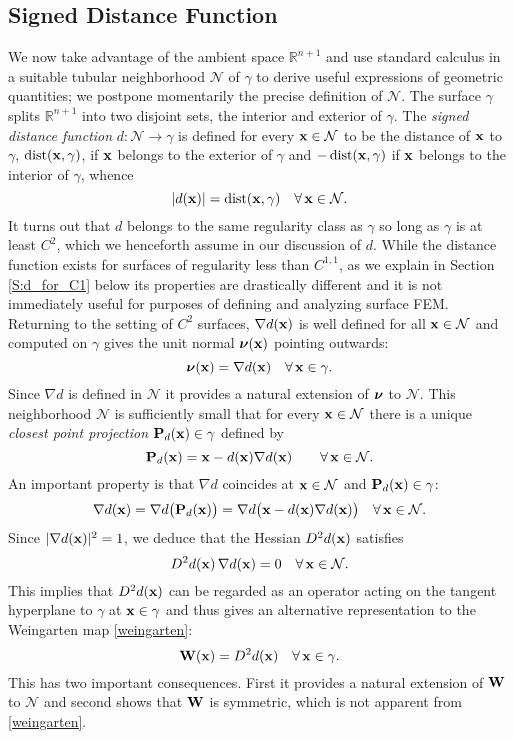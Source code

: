 \subsection{Signed Distance Function}\label{S:distance-function}
%
We now take advantage of the ambient space $\mathbb R^{n+1}$ and use
standard calculus in a suitable tubular neighborhood $\mathcal N$ of $\gamma$
to derive useful expressions of geometric quantities; we postpone
momentarily the precise definition of $\mathcal N$.  The surface $\gamma$ splits
$\mathbb{R}^{n+1}$ into two disjoint sets, the interior and exterior of $\gamma$.
The \emph{signed distance function} $d:\mathcal N \rightarrow \gamma$ is
defined for every ${\bf x}\in\mathcal N$ to be the distance of ${\bf x}$ to $\gamma$,
$\operatorname{dist}({\bf x},\gamma)$, if
${\bf x}$ belongs to the exterior of $\gamma$ and $-\operatorname{dist}({\bf x},\gamma)$ if ${\bf x}$ belongs
to the interior of $\gamma$, whence
%
\[
|d({\bf x})| = \operatorname{dist}({\bf x},\gamma)
\quad\forall \, {\bf x}\in\mathcal N.
\]
%
It turns out that $d$ belongs to the same regularity class as $\gamma$ so long as $\gamma$ is at least $C^2$, which we henceforth assume in our discussion of $d$.  While the distance function exists for surfaces of regularity less than $C^{1,1}$, as we explain in Section \ref{S:d_for_C1} below its properties are drastically different and it is not immediately useful for purposes of defining and analyzing surface FEM.  Returning to the setting of $C^2$ surfaces, $\nabla d({\bf x})$ is well defined for all
${\bf x}\in\mathcal N$ and computed on $\gamma$ gives the unit normal ${\boldsymbol \nu}({\bf x})$
pointing outwards:
%
\[
{\boldsymbol \nu}({\bf x}) = \nabla d({\bf x})
\quad\forall \, {\bf x}\in\gamma.
\]
%
Since $\nabla d$ is defined in $\mathcal N$ it provides a natural extension of
${\boldsymbol \nu}$ to $\mathcal N$. This neighborhood $\mathcal N$ is sufficiently small
that for every ${\bf x}\in\mathcal N$ there is a unique {\it closest point projection}
${\bf P}_d({\bf x}) \in\gamma$ defined by
%
\begin{equation}\label{e:lift_dist}
{\bf P}_d({\bf x}) = {\bf x} - d({\bf x}) \nabla d({\bf x})  \qquad
\forall \, {\bf x} \in \mathcal N.
\end{equation}
%
An important property is that $\nabla d$ coincides at ${\bf x}\in\mathcal N$ and
${\bf P}_d({\bf x})\in\gamma$:
%
\begin{equation}\label{property-d}
\nabla d({\bf x}) = \nabla d\big({\bf P}_d({\bf x}) \big)
= \nabla d \big({\bf x} - d({\bf x}) \nabla d({\bf x}) \big)
\quad\forall \, {\bf x}\in\mathcal{N}.
\end{equation}
%
Since $|\nabla d({\bf x})|^2 = 1$, we deduce that the Hessian $D^2 d({\bf x})$ satisfies
%
\begin{equation}\label{zero-eig}
D^2 d({\bf x}) \, \nabla d({\bf x}) = 0
\quad\forall \, {\bf x} \in \mathcal N.
\end{equation}
%
This implies that $D^2 d({\bf x})$ can be regarded as an operator acting on the tangent
hyperplane to $\gamma$ at ${\bf x}\in\gamma$ and thus gives
an alternative representation to the Weingarten map \eqref{weingarten}:
%
\[
{\bf W}({\bf x}) = D^2 d({\bf x})
\quad\forall \, {\bf x} \in\gamma.
\]
%
This has two important consequences. First it provides a natural extension of ${\bf W}$
to $\mathcal N$ and second shows that ${\bf W}$ is symmetric, which is not apparent
from \eqref{weingarten}.

